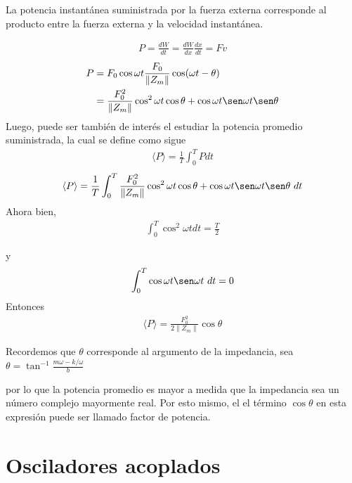 \documentclass[12pt]{article}
\begin{document}
La potencia instantánea suministrada por la fuerza externa corresponde al producto entre la fuerza externa y la velocidad instantánea.

\begin{align*}
    P = \frac{dW}{dt} = \frac{dW}{dx}\frac{dx }{dt} = Fv
\end{align*}
\begin{align*}
    P &= F_0 \cos \omega t  \frac{F_0}{\|Z_m\|}\cos(\omega t - \theta )\\
    &= \frac{F_0^{2}}{\|Z_m\|}\cos^{2}\omega t \cos\theta + \cos \omega t \sen\omega t \sen\theta
\end{align*}
Luego, puede ser también de interés el estudiar la potencia promedio suministrada, la cual se define como sigue
\begin{align}
    \langle P\rangle = \frac{1}{T} \int_0^{T} P dt 
\end{align}
\begin{align*}
   \langle P\rangle = \frac{1}{T} \int_{0}^{T} \frac{F_0^{2}}{\|Z_m\|}  \cos^{2}\omega t \cos\theta + \cos \omega t \sen\omega t \sen\theta \ dt
\end{align*}
Ahora bien,
\begin{align*}
    \int_{0}^{T} \cos^{2} \omega t dt = \frac{T}{2} 
\end{align*}

y 
\begin{align*}
    \int_{0}^{T} \cos \omega t \sen \omega t \ dt  = 0
\end{align*}
Entonces 
\begin{align*}
    \langle P \rangle = \frac{ F_0^{2}}{2\|Z_m\|}\cos\theta
\end{align*}

Recordemos que \(\theta \) corresponde al argumento de la impedancia, sea \(\theta = \tan^{-1} \frac{m\omega - k/\omega}{b}\)

por lo que la potencia promedio es mayor a medida que la impedancia sea un número complejo mayormente real. Por esto mismo, el el término \(\cos \theta\) en esta expresión puede ser llamado factor de potencia.

\section{Osciladores acoplados}
\end{document}
